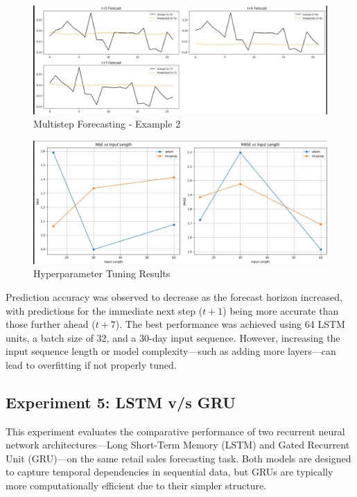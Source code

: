\documentclass[conference]{IEEEtran}
\begin{document}
\begin{figure}[H]
    \centering
    \includegraphics[width=0.95\linewidth]{Multistep_forecasting_2.jpg}
    \caption{Multistep Forecasting - Example 2}
    \label{fig:multistep2}
\end{figure}

\begin{figure}[H]
    \centering
    \includegraphics[width=0.95\linewidth]{hyperparameter.jpg}
    \caption{Hyperparameter Tuning Results}
    \label{fig:hyperparam}
\end{figure}

Prediction accuracy was observed to decrease as the forecast horizon increased, with predictions for the immediate next step (\( t+1 \)) being more accurate than those further ahead (\( t+7 \)). The best performance was achieved using 64 LSTM units, a batch size of 32, and a 30-day input sequence. However, increasing the input sequence length or model complexity—such as adding more layers—can lead to overfitting if not properly tuned.


\subsection{Experiment 5: LSTM v/s GRU}
This experiment evaluates the comparative performance of two recurrent neural network architectures—Long Short-Term Memory (LSTM) and Gated Recurrent Unit (GRU)—on the same retail sales forecasting task. Both models are designed to capture temporal dependencies in sequential data, but GRUs are typically more computationally efficient due to their simpler structure.
\end{document}
